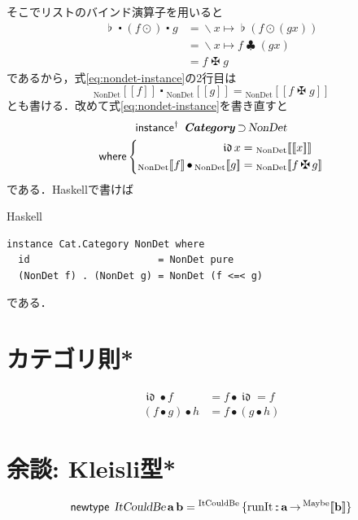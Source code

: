 \documentclass[a5paper,twoside,fleqn,draft]{jsbook}
\def\[{[\![}
\def\]{]\!]}
\newcommand{\programminglanguage}[1]{\textsf{#1}}
\newcommand{\haskell}{\programminglanguage{Haskell}}
\newenvironment{haskellcode}{\begin{itembox}[r]{\haskell}}{\end{itembox}}
\newcommand{\mKeyword}[1]{\mathsf{#1}}
\newcommand{\mInstanceDeclKeyword}{\mKeyword{instance}}
\newcommand{\mNewTypeDeclKeyword}{\mKeyword{newtype}}
\newcommand{\mWhereKeyword}{\mKeyword{where}}
\newcommand{\mPolymorphic}[1]{{#1}^\dagger}
\DeclareMathOperator{\mInstanceDeclPolymorphic}{\mPolymorphic{\mInstanceDeclKeyword}}
\DeclareMathOperator{\mNewTypeDecl}{\mNewTypeDeclKeyword}
\DeclareMathOperator{\mSuperSet}{\supset}
\DeclareMathOperator{\mWhere}{\mWhereKeyword}
\newcommand{\mVarSpecialFunc}[1]{\mathfrak{#1}}
\DeclareMathOperator{\mIdCat}{\mVarSpecialFunc{id}}
\DeclareMathOperator{\mBindComp}{\maltese}
\DeclareMathOperator{\mBindList}{\clubsuit}
\DeclareMathOperator{\mCompFunc}{\centerdot}
\DeclareMathOperator{\mCompCat}{\bullet}
\DeclareMathOperator{\mFuncArrow}{\rightarrow}
\DeclareMathOperator{\mIn}{{:\!:}}
\DeclareMathOperator{\mJoinList}{\flat} %
\DeclareMathOperator{\mLambda}{\backslash}
\DeclareMathOperator{\mLambdaArrow}{\mapsto}
\DeclareMathOperator{\mMapList}{\odot}
\newcommand{\mType}[1]{\mathbf{#1}} %
\newcommand{\mA}{\mType{a}}
\newcommand{\mB}{\mType{b}}
\newcommand{\mTypeAssemble}[2]{{}^\mathrm{#1}\[\mType{#2}\]}
\newcommand{\mMaybeType}[1]{\mTypeAssemble{Maybe}{#1}}
\newcommand{\mTypeConstructor}[1]{\textsl{#1}}
\newcommand{\mValueConstructor}[1]{\mathrm{#1}}
\newcommand{\mValueWith}[2]{{}_\mValueConstructor{#1}\[#2\]}
\newcommand{\mValueRecordBeginWith}[1]{{}^\mValueConstructor{#1}\,\{}
\newcommand{\mValueRecordEnd}{\}}
\newcommand{\mValueRecordWith}[2]{\mValueRecordBeginWith{#1}{#2}\mValueRecordEnd}
\newcommand{\mPureWith}[1]{\[#1\]}
\newcommand{\mTypeClass}[1]{\textbf{\textit{#1}}}
\newcommand{\mCatTypeClass}{\mTypeClass{Category}}
\begin{document}
そこでリストのバインド演算子を用いると
\begin{align}
  \mJoinList\mCompFunc{}(f\mMapList)\mCompFunc g
  &=\mLambda x\mLambdaArrow\mJoinList{}(f\mMapList(gx))\\
  &=\mLambda x\mLambdaArrow f\mBindList(gx)\\
  &=f\mBindComp g
\end{align}
であるから，式\eqref{eq:nondet-instance}の2行目は
\begin{equation}
  \mValueWith{NonDet}{f}\mCompFunc\mValueWith{NonDet}{g}
  =\mValueWith{NonDet}{f\mBindComp g}
\end{equation}
とも書ける．改めて式\eqref{eq:nondet-instance}を書き直すと
\begin{multline}
  \mInstanceDeclPolymorphic\;
  \mCatTypeClass\mSuperSet\mTypeConstructor{NonDet}\\
  \mWhere\left\{
  \begin{aligned}
    \mIdCat x
    &=\mValueWith{NonDet}{\mPureWith{x}}\\ %
    \mValueWith{NonDet}{f}\mCompCat\mValueWith{NonDet}{g}
    &=\mValueWith{NonDet}{f\mBindComp g}
  \end{aligned}
  \right.
\end{multline}
である．\haskell で書けば
\begin{haskellcode}
\begin{verbatim}
instance Cat.Category NonDet where
  id                      = NonDet pure
  (NonDet f) . (NonDet g) = NonDet (f <=< g)
\end{verbatim}
\end{haskellcode}
である．

\section{カテゴリ則*}

\begin{align}
\mIdCat\mCompCat f&=f\mCompCat\mIdCat=f\\
(f\mCompCat g)\mCompCat h&=f\mCompCat(g\mCompCat h)
\end{align}

\section{余談: Kleisli型*}

\begin{equation}
  \mNewTypeDecl\;
  \mTypeConstructor{ItCouldBe}\,\mA\,\mB
  =\mValueRecordWith{ItCouldBe}{\mathrm{runIt}\mIn\mA\mFuncArrow\mMaybeType{b}}
\end{equation}
\end{document}
